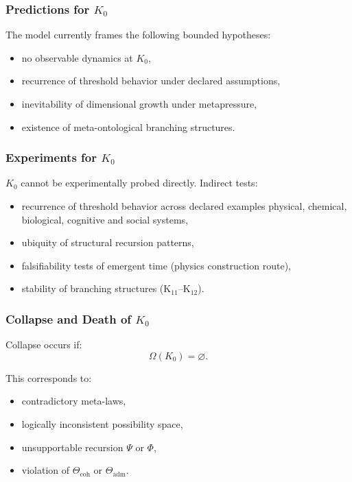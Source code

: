 \subsubsection{Predictions for \texorpdfstring{$K_0$}{K_0}}

The model currently frames the following bounded hypotheses: \begin{itemize}
    \item no observable dynamics at $K_0$,
    \item recurrence of threshold behavior under declared assumptions,
    \item inevitability of dimensional growth under metapressure,
    \item existence of meta-ontological branching structures.
\end{itemize}

\subsubsection{Experiments for \texorpdfstring{$K_0$}{K_0}}

$K_0$ cannot be experimentally probed directly.
Indirect tests:
\begin{itemize}
    \item recurrence of threshold behavior across declared examples physical,
          chemical, biological, cognitive and social systems,
    \item ubiquity of structural recursion patterns,
    \item falsifiability tests of emergent time (physics construction route),
    \item stability of branching structures (K$_{11}$–K$_{12}$).
\end{itemize}

\subsubsection{Collapse and Death of \texorpdfstring{$K_0$}{K_0}}

Collapse occurs if:
\[
\Omega(K_0) = \varnothing.
\]

This corresponds to:
\begin{itemize}
    \item contradictory meta-laws,
    \item logically inconsistent possibility space,
    \item unsupportable recursion $\Psi$ or $\Phi$,
    \item violation of $\Theta_{\mathrm{coh}}$ or $\Theta_{\mathrm{adm}}$.
\end{itemize}

